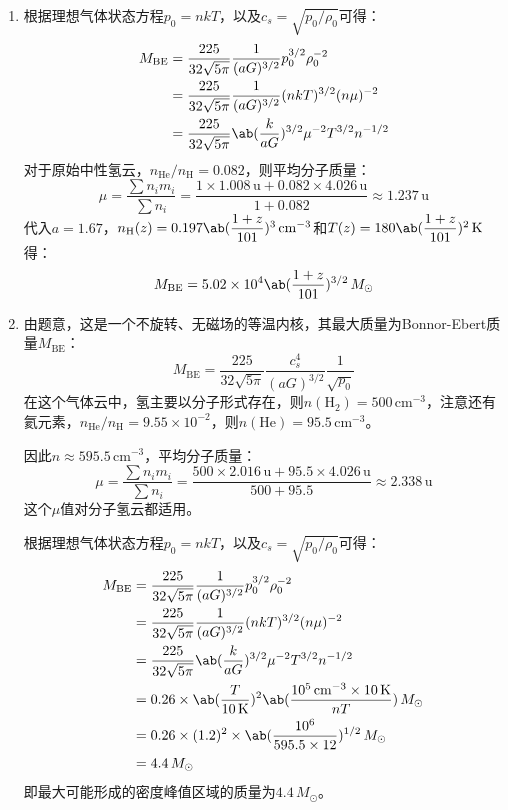 \documentclass[a4paper,fontset=none]{ctexart}
\begin{document}
\begin{enumerate}
    \bigskip
    \item[41.2]
    根据理想气体状态方程$p_0 = nkT$，以及$c_s = \sqrt{p_0/\rho_0}$可得：
    \begin{align*}
        M_{\mathrm{BE}}
        &= \frac{225}{32\sqrt{5\pi}} \frac{1}{(aG)^{3/2}}p_0^{3/2}\rho_0^{-2} \\
        &= \frac{225}{32\sqrt{5\pi}} \frac{1}{(aG)^{3/2}} (nkT)^{3/2} (n\mu)^{-2} \\
        &= \frac{225}{32\sqrt{5\pi}} \ab(\frac{k}{aG})^{3/2} \mu^{-2} T^{3/2} n^{-1/2}
    \end{align*}
    对于原始中性氢云，$n_{\mathrm{He}}/n_{\mathrm{H}} = 0.082$，则平均分子质量：
    \[
        \mu = \frac{\sum n_i m_i}{\sum n_i} = \frac{1 \times 1.008\,\mathrm{u} + 0.082 \times 4.026\,\mathrm{u}}{1 + 0.082} \approx 1.237\,\mathrm{u}
    \]
    代入$a = 1.67$，$n_{\mathrm{H}}(z) = 0.197\ab(\dfrac{1+z}{101})^3\,\mathrm{cm^{-3}}$和$T(z) = 180\ab(\dfrac{1+z}{101})^2\,\mathrm{K}$得：
    \[
        M_{\mathrm{BE}} = 5.02 \times 10^4 \ab(\frac{1+z}{101})^{3/2}\,M_\odot
    \]

    \bigskip
    \item[41.3]
    由题意，这是一个不旋转、无磁场的等温内核，其最大质量为Bonnor-Ebert质量$M_{\mathrm{BE}}$：
    \[
        M_{\mathrm{BE}} = \frac{225}{32\sqrt{5\pi}} \frac{c_s^4}{(aG)^{3/2}}\frac{1}{\sqrt{p_0}}
    \]
    在这个气体云中，氢主要以分子形式存在，则$n(\mathrm{H_2}) = 500\,\mathrm{cm^{-3}}$，注意还有氦元素，$n_{\mathrm{He}}/n_{\mathrm{H}} = 9.55 \times 10^{-2}$，则$n(\mathrm{He}) = 95.5\,\mathrm{cm^{-3}}$。

    因此$n \approx 595.5\,\mathrm{cm^{-3}}$，平均分子质量：
    \[
        \mu = \frac{\sum n_i m_i}{\sum n_i} = \frac{500 \times 2.016\,\mathrm{u} + 95.5 \times 4.026\,\mathrm{u}}{500 + 95.5} \approx 2.338\,\mathrm{u}
    \]
    这个$\mu$值对分子氢云都适用。

    根据理想气体状态方程$p_0 = nkT$，以及$c_s = \sqrt{p_0/\rho_0}$可得：
    \begin{align*}
        M_{\mathrm{BE}}
        &= \frac{225}{32\sqrt{5\pi}} \frac{1}{(aG)^{3/2}}p_0^{3/2}\rho_0^{-2} \\
        &= \frac{225}{32\sqrt{5\pi}} \frac{1}{(aG)^{3/2}} (nkT)^{3/2} (n\mu)^{-2} \\
        &= \frac{225}{32\sqrt{5\pi}} \ab(\frac{k}{aG})^{3/2} \mu^{-2} T^{3/2} n^{-1/2} \\
        &= 0.26 \times \ab(\frac{T}{10\,\mathrm{K}})^2 \ab(\frac{10^5\,\mathrm{cm^{-3}} \times 10\,\mathrm{K}}{nT})\,M_\odot \\
        &= 0.26 \times (1.2)^2 \times \ab(\frac{10^6}{595.5 \times 12})^{1/2}\,M_\odot \\
        &= 4.4\,M_\odot
    \end{align*}
    即最大可能形成的密度峰值区域的质量为$4.4\,M_\odot$。
\end{enumerate}
\end{document}
